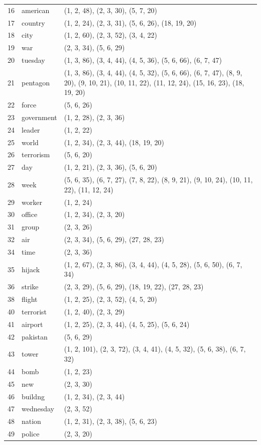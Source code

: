 \documentclass[a4paper,twoside,10pt]{article}
\begin{document}
\begin{center}
\begin{longtable}{p{}p{}p{}}
 16 & american     &(1, 2, 48), (2, 3, 30), (5, 7, 20)\\
 17 & country      &(1, 2, 24), (2, 3, 31), (5, 6, 26), (18, 19, 20)\\
  18 & city         &(1, 2, 60), (2, 3, 52), (3, 4, 22)\\
   19 & war          &(2, 3, 34), (5, 6, 29)\\
 20 & tuesday      &(1, 3, 86), (3, 4, 44), (4, 5, 36), (5, 6, 66), (6, 7, 47)\\
21 & pentagon     &(1, 3, 86), (3, 4, 44), (4, 5, 32), (5, 6, 66), (6, 7, 47), (8, 9, 20), (9, 10, 21), (10, 11, 22), (11, 12, 24), (15, 16, 23), (18, 19, 20)\\
 22 & force        &(5, 6, 26)\\
 23 & government   &(1, 2, 28), (2, 3, 36)\\
  24 & leader       &(1, 2, 22)\\
 25 & world        &(1, 2, 34), (2, 3, 44), (18, 19, 20)\\
  26 & terrorism    &(5, 6, 20)\\
 27 & day          &(1, 2, 21), (2, 3, 36), (5, 6, 20)\\
28 & week         &(5, 6, 35), (6, 7, 27), (7, 8, 22), (8, 9, 21), (9, 10, 24), (10, 11, 22), (11, 12, 24)\\
 29 & worker       &(1, 2, 24)\\
 30 & office       &(1, 2, 34), (2, 3, 20)\\
  31 & group        &(2, 3, 26)\\
 32 & air          &(2, 3, 34), (5, 6, 29), (27, 28, 23)\\
  34 & time         &(2, 3, 36)\\
 35 & hijack       &(1, 2, 67), (2, 3, 86), (3, 4, 44), (4, 5, 28), (5, 6, 50), (6, 7, 34)\\
 36 & strike       &(2, 3, 29), (5, 6, 29), (18, 19, 22), (27, 28, 23)\\
  38 & flight       &(1, 2, 25), (2, 3, 52), (4, 5, 20)\\
   40 & terrorist    &(1, 2, 40), (2, 3, 29)\\
  41 & airport      &(1, 2, 25), (2, 3, 44), (4, 5, 25), (5, 6, 24)\\
   42 & pakistan     &(5, 6, 29)\\
 43 & tower        &(1, 2, 101), (2, 3, 72), (3, 4, 41), (4, 5, 32), (5, 6, 38), (6, 7, 32)\\
  44 & bomb         &(1, 2, 23)\\
 45 & new          &(2, 3, 30)\\
  46 & buildng      &(1, 2, 34), (2, 3, 44)\\
   47 & wednesday    &(2, 3, 52)\\
 48 & nation       &(1, 2, 31), (2, 3, 38), (5, 6, 23)\\
 49 & police       &(2, 3, 20)
\end{longtable}
\end{center}
\end{document}
